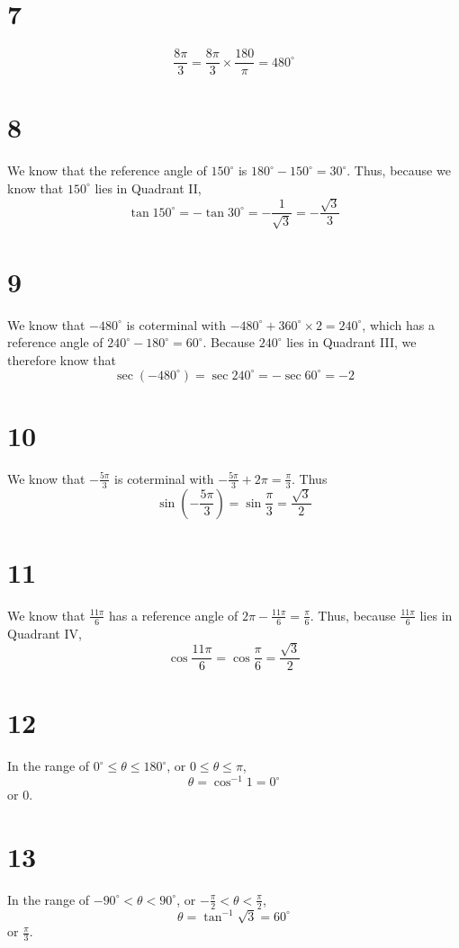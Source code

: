 \documentclass{article}
\theoremstyle{definition}
\newcommand{\?}{\stackrel{?}{=}}
\begin{document}
\section*{7}
\[ \frac{8\pi}{3}=\frac{8\pi}{3}\times\frac{180}{\pi}=480^\circ \]

\section*{8}
We know that the reference angle of $150^\circ$ is $180^\circ-150^\circ=30^\circ$. Thus, because we know that $150^\circ$ lies in Quadrant II,
\[ \tan 150^\circ=-\tan 30^\circ=-\frac{1}{\sqrt{3}}=-\frac{\sqrt{3}}{3} \]

\section*{9}
We know that $-480^\circ$ is coterminal with $-480^\circ+360^\circ\times 2=240^\circ$, which has a reference angle of 
$240^\circ-180^\circ=60^\circ$. Because $240^\circ$ lies in Quadrant III, we therefore know that
\[ \sec(-480^\circ)=\sec 240^\circ=-\sec 60^\circ=-2 \]

\section*{10}
We know that $-\frac{5\pi}{3}$ is coterminal with $-\frac{5\pi}{3}+2\pi=\frac{\pi}{3}$. Thus
\[ \sin(-\frac{5\pi}{3})=\sin\frac{\pi}{3}=\frac{\sqrt{3}}{2} \]

\section*{11}
We know that $\frac{11\pi}{6}$ has a reference angle of $2\pi-\frac{11\pi}{6}=\frac{\pi}{6}$. Thus, because $\frac{11\pi}{6}$ lies in Quadrant IV,
\[ \cos\frac{11\pi}{6}=\cos\frac{\pi}{6}=\frac{\sqrt{3}}{2} \]

\section*{12}
In the range of $0^\circ\le \theta\le 180^\circ$, or $0\le\theta\le\pi$,
\[ \theta=\cos^{-1}1=0^\circ \] or 0.

\section*{13}
In the range of $-90^\circ <\theta<90^\circ$, or $-\frac{\pi}{2}<\theta<\frac{\pi}{2}$,
\[ \theta=\tan^{-1}\sqrt{3}=60^\circ \] or $\frac{\pi}{3}$.
\end{document}
